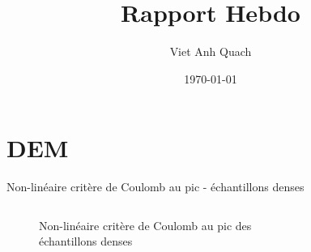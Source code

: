 \documentclass[10pt]{beamer}
\title{Rapport Hebdo}
\author{Viet Anh Quach}
\institute{3SR}
\date{\today}
\begin{document}
\begin{frame}
    \titlepage
\end{frame}


\section{DEM}

\begin{frame}{Non-linéaire critère de Coulomb au pic - échantillons denses}
    \begin{columns}
        \begin{column}{0.5\textwidth}
            \begin{figure}[h]
                \centering
                \caption{Non-linéaire critère de Coulomb au pic des échantillons denses}
            \end{figure}
        \end{column}
        \begin{column}{0.5\textwidth}
            \begin{figure}[h]
                \centering

\end{figure}
\end{column}
\end{columns}
\end{frame}
\end{document}

